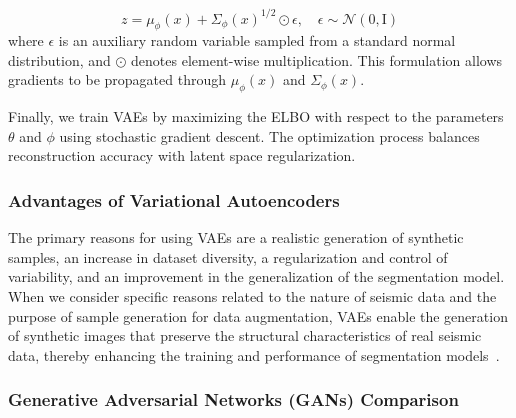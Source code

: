 \documentclass{ieeeaccess}
\begin{document}
\begin{equation}
z = \mu_\phi(x) + \Sigma_\phi(x)^{1/2} \odot \epsilon, \quad \epsilon \sim \mathcal{N}(0, \mathrm{I})
\end{equation}
where $\epsilon$ is an auxiliary random variable sampled from a standard normal distribution, and $\odot$ denotes element-wise multiplication. This formulation allows gradients to be propagated through $\mu_\phi(x)$ and $\Sigma_\phi(x)$.

Finally, we train VAEs by maximizing the ELBO with respect to the parameters $\theta$ and $\phi$ using stochastic gradient descent. The optimization process balances reconstruction accuracy with latent space regularization.

\subsubsection{Advantages of Variational Autoencoders}
The primary reasons for using VAEs are a realistic generation of synthetic samples, an increase in dataset diversity, a regularization and control of variability, and an improvement in the generalization of the segmentation model. When we consider specific reasons related to the nature of seismic data and the purpose of sample generation for data augmentation, VAEs enable the generation of synthetic images that preserve the structural characteristics of real seismic data, thereby enhancing the training and performance of segmentation models~\cite{Henriques2021,Wang2021,Anjom2024}.

\subsubsection{Generative Adversarial Networks (GANs) Comparison}
\end{document}
